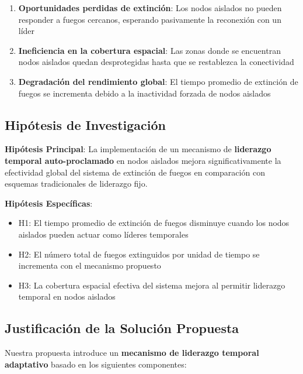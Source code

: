 \documentclass{article}
\begin{document}
\begin{enumerate}
    \item \textbf{Oportunidades perdidas de extinción}: Los nodos aislados no pueden responder a fuegos cercanos, esperando pasivamente la reconexión con un líder
    
    \item \textbf{Ineficiencia en la cobertura espacial}: Las zonas donde se encuentran nodos aislados quedan desprotegidas hasta que se restablezca la conectividad
    
    \item \textbf{Degradación del rendimiento global}: El tiempo promedio de extinción de fuegos se incrementa debido a la inactividad forzada de nodos aislados
\end{enumerate}

\subsection{Hipótesis de Investigación}
\textbf{Hipótesis Principal}: La implementación de un mecanismo de \textbf{liderazgo temporal auto-proclamado} en nodos aislados mejora significativamente la efectividad global del sistema de extinción de fuegos en comparación con esquemas tradicionales de liderazgo fijo.

\textbf{Hipótesis Específicas}:
\begin{itemize}
    \item H1: El tiempo promedio de extinción de fuegos disminuye cuando los nodos aislados pueden actuar como líderes temporales
    \item H2: El número total de fuegos extinguidos por unidad de tiempo se incrementa con el mecanismo propuesto
    \item H3: La cobertura espacial efectiva del sistema mejora al permitir liderazgo temporal en nodos aislados
\end{itemize}

\subsection{Justificación de la Solución Propuesta}
Nuestra propuesta introduce un \textbf{mecanismo de liderazgo temporal adaptativo} basado en los siguientes componentes:
\end{document}
